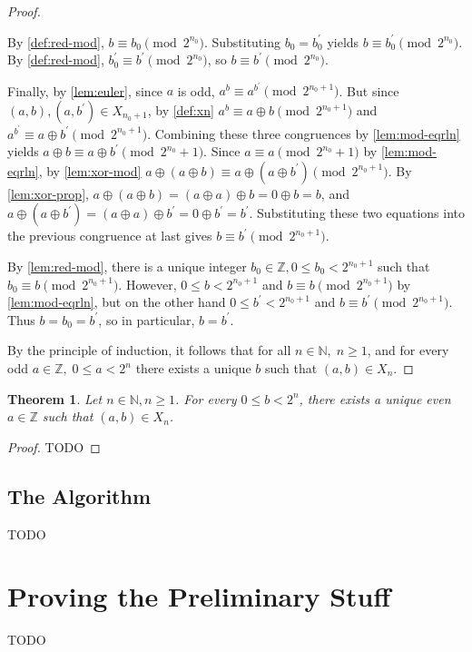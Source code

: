 \documentclass[1gpt]{article}
\theoremstyle{break}
\newtheorem{theorem}{Theorem}[section]
\newcommand{\xor}{\oplus}
\begin{document}
\begin{proof}
\begin{enumerate}
            By \ref{def:red-mod}, $b \equiv b_0 \pmod{2^{n_0}}$. Substituting
            $b_0 = b^\prime_0$ yields $b \equiv b^\prime_0 \pmod{2^{n_0}}$. By
            \ref{def:red-mod}, $b^\prime_0 \equiv b^\prime \pmod{2^{n_0}}$, so
            $b \equiv b^\prime \pmod{2^{n_0}}$.

            Finally, by \ref{lem:euler}, since $a$ is odd, $a^b \equiv
            a^{b^\prime} \pmod{2^{n_0+1}}$. But since $(a, b), (a, b^\prime)
            \in X_{n_0+1}$, by \ref{def:xn} $a^b \equiv a \xor b
            \pmod{2^{n_0+1}}$ and $a^{b^\prime} \equiv a \xor b^\prime
            \pmod{2^{n_0+1}}$. Combining these three congruences by
            \ref{lem:mod-eqrln} yields $a \xor b \equiv a \xor b^\prime
            \pmod{2^{n_0}+1}$. Since $a \equiv a \pmod{2^{n_0} + 1}$ by
            \ref{lem:mod-eqrln}, by \ref{lem:xor-mod} $a \xor (a \xor b) \equiv
            a \xor (a \xor b^\prime) \pmod{2^{n_0+1}}$. By \ref{lem:xor-prop},
            $a \xor (a \xor b) = (a \xor a) \xor b = 0 \xor b = b$, and $a \xor
            (a \xor b^\prime) = (a \xor a) \xor b^\prime = 0 \xor b^\prime =
            b^\prime$. Substituting these two equations into the previous
            congruence at last gives $b \equiv b^\prime \pmod{2^{n_0+1}}$.

            By \ref{lem:red-mod}, there is a unique integer $b_0 \in
            \mathbb{Z}, 0 \leq b_0 < 2^{n_0+1}$ such that $b_0 \equiv b
            \pmod{2^{n_0+1}}$. However, $0 \leq b < 2^{n_0+1}$ and $b \equiv b
            \pmod{2^{n_0+1}}$ by \ref{lem:mod-eqrln}, but on the other hand $0
            \leq b^\prime < 2^{n_0+1}$ and $b \equiv b^\prime
            \pmod{2^{n_0+1}}$. Thus $b = b_0 = b^\prime$, so in particular, $b
            = b^\prime$.

    \end{enumerate}

    By the principle of induction, it follows that for all $n \in \mathbb{N},\;
    n \geq 1$, and for every odd $a \in \mathbb{Z},\; 0 \leq a < 2^n$ there
    exists a unique $b$ such that $(a, b) \in X_n$.

    \hfill\proofSymbol

\end{proof}

\begin{theorem}
    \label{thm:even-a}
    Let $n \in \mathbb{N}, n \geq 1$. For every $0 \leq b < 2^n$, there
    exists a unique even $a \in \mathbb{Z}$ such that $(a, b) \in X_n$.
\end{theorem}

\begin{proof}

    TODO

    \hfill\proofSymbol

\end{proof}

\subsection{The Algorithm}

TODO

\section{Proving the Preliminary Stuff}

TODO
\end{document}
